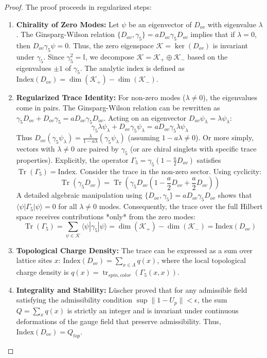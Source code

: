 \begin{proof}
The proof proceeds in regularized steps:
\begin{enumerate}
    \item \textbf{Chirality of Zero Modes:} Let $\psi$ be an eigenvector of $D_{ov}$ with eigenvalue $\lambda$. The Ginsparg-Wilson relation $\{D_{ov}, \gamma_5\} = a D_{ov} \gamma_5 D_{ov}$ implies that if $\lambda = 0$, then $D_{ov} \gamma_5 \psi = 0$. Thus, the zero eigenspace $\mathcal{K} = \ker(D_{ov})$ is invariant under $\gamma_5$. Since $\gamma_5^2 = \mathbb{I}$, we decompose $\mathcal{K} = \mathcal{K}_+ \oplus \mathcal{K}_-$ based on the eigenvalues $\pm 1$ of $\gamma_5$. The analytic index is defined as $\text{Index}(D_{ov}) = \dim(\mathcal{K}_+) - \dim(\mathcal{K}_-)$.
    
    \item \textbf{Regularized Trace Identity:} For non-zero modes ($\lambda \neq 0$), the eigenvalues come in pairs. The Ginsparg-Wilson relation can be rewritten as $\gamma_5 D_{ov} + D_{ov} \gamma_5 = a D_{ov} \gamma_5 D_{ov}$.
    Acting on an eigenvector $D_{ov} \psi_\lambda = \lambda \psi_\lambda$:
    \[
    \gamma_5 \lambda \psi_\lambda + D_{ov} \gamma_5 \psi_\lambda = a D_{ov} \gamma_5 \lambda \psi_\lambda
    \]
    Thus $D_{ov} (\gamma_5 \psi_\lambda) = \frac{\lambda}{1 - a\lambda} (\gamma_5 \psi_\lambda)$ (assuming $1-a\lambda \neq 0$). Or more simply, vectors with $\lambda \neq 0$ are paired by $\gamma_5$ (or are chiral singlets with specific trace properties).
    Explicitly, the operator $\Gamma_5 = \gamma_5(1 - \frac{a}{2}D_{ov})$ satisfies $\operatorname{Tr}(\Gamma_5) = \text{Index}$.
    Consider the trace in the non-zero sector. Using cyclicity:
    \[
    \operatorname{Tr}(\gamma_5 D_{ov}) = \operatorname{Tr}(\gamma_5 D_{ov} (1 - \frac{a}{2} D_{ov} + \frac{a}{2} D_{ov}))
    \]
    A detailed algebraic manipulation using $\{D_{ov}, \gamma_5\} = a D_{ov} \gamma_5 D_{ov}$ shows that $\langle \psi | \Gamma_5 | \psi \rangle = 0$ for all $\lambda \neq 0$ modes. Consequently, the trace over the full Hilbert space receives contributions *only* from the zero modes:
    \begin{equation}
    \operatorname{Tr}(\Gamma_5) = \sum_{\psi \in \mathcal{K}} \langle \psi | \gamma_5 | \psi \rangle = \dim(\mathcal{K}_+) - \dim(\mathcal{K}_-) = \text{Index}(D_{ov})
    \end{equation}
    
    \item \textbf{Topological Charge Density:} The trace can be expressed as a sum over lattice sites $x$: $\text{Index}(D_{ov}) = \sum_{x \in \Lambda} q(x)$, where the local topological charge density is $q(x) = \operatorname{tr}_{spin, color} (\Gamma_5(x,x))$.
    
    \item \textbf{Integrality and Stability:} Lüscher proved that for any admissible field satisfying the admissibility condition $\sup \|1 - U_p\| < \epsilon$, the sum $Q = \sum_x q(x)$ is strictly an integer and is invariant under continuous deformations of the gauge field that preserve admissibility. Thus, $\text{Index}(D_{ov}) = Q_{top}$.
\end{enumerate}
\end{proof}


